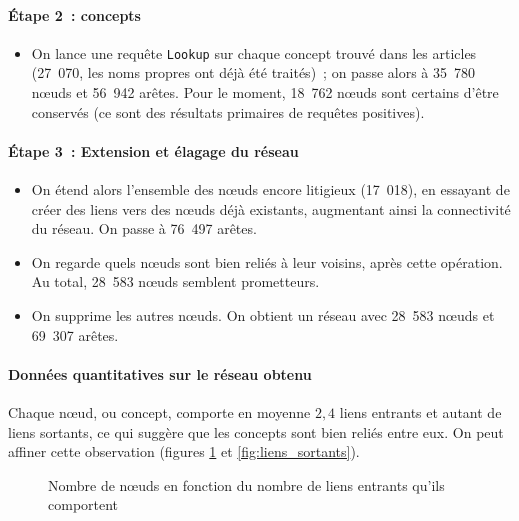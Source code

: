 \documentclass[a4paper, 12pt]{article}
\begin{document}
\paragraph{Étape 2~: concepts}

\begin{itemize}
 \item On lance une requête \texttt{Lookup} sur chaque concept trouvé dans les articles (27~070, les noms propres ont déjà été traités)~; on passe alors à 35~780 n\oe{}uds et 56~942 arêtes. Pour le moment, 18~762 n\oe{}uds sont certains d'être conservés (ce sont des résultats primaires de requêtes positives).
\end{itemize}


\paragraph{Étape 3~: Extension et élagage du réseau}

\begin{itemize}
 \item On étend alors l'ensemble des n\oe{}uds encore litigieux (17~018), en essayant de créer des liens vers des n\oe{}uds déjà existants, augmentant ainsi la connectivité du réseau. On passe à 76~497 arêtes.
 \item On regarde quels n\oe{}uds sont bien reliés à leur voisins, après cette opération. Au total, 28~583 n\oe{}uds semblent prometteurs.
 \item On supprime les autres n\oe{}uds. On obtient un réseau avec 28~583 n\oe{}uds et 69~307 arêtes.
\end{itemize}


\paragraph{Données quantitatives sur le réseau obtenu}

Chaque n\oe{}ud, ou concept, comporte en moyenne $2,4$ liens entrants et autant de liens sortants, ce qui suggère que les concepts sont bien reliés entre eux. On peut affiner cette observation (figures \ref{fig:liens_entrants} et \ref{fig:liens_sortants}).

\begin{figure}[h]
 \centering
 \caption{Nombre de n\oe{}uds en fonction du nombre de liens entrants qu'ils comportent}
 \label{fig:liens_entrants}
\end{figure}
\end{document}
